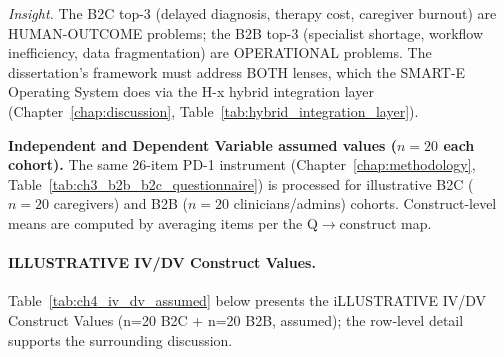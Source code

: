 \noindent\textit{Insight.} The B2C top-3 (delayed diagnosis, therapy cost, caregiver burnout) are HUMAN-OUTCOME problems; the B2B top-3 (specialist shortage, workflow inefficiency, data fragmentation) are OPERATIONAL problems. The dissertation's framework must address BOTH lenses, which the SMART-E Operating System does via the H-x hybrid integration layer (Chapter~\ref{chap:discussion}, Table~\ref{tab:hybrid_integration_layer}).

\noindent\textbf{Independent and Dependent Variable assumed values ($n{=}20$ each cohort).} The same 26-item PD-1 instrument (Chapter~\ref{chap:methodology}, Table~\ref{tab:ch3_b2b_b2c_questionnaire}) is processed for illustrative B2C ($n{=}20$ caregivers) and B2B ($n{=}20$ clinicians/admins) cohorts. Construct-level means are computed by averaging items per the Q$\to$construct map.

\noindent{}\vspace{4pt}

\paragraph{ILLUSTRATIVE IV/DV Construct Values.}
\noindent Table~\ref{tab:ch4_iv_dv_assumed} below presents the iLLUSTRATIVE IV/DV Construct Values (n=20 B2C + n=20 B2B, assumed); the row-level detail supports the surrounding discussion.



